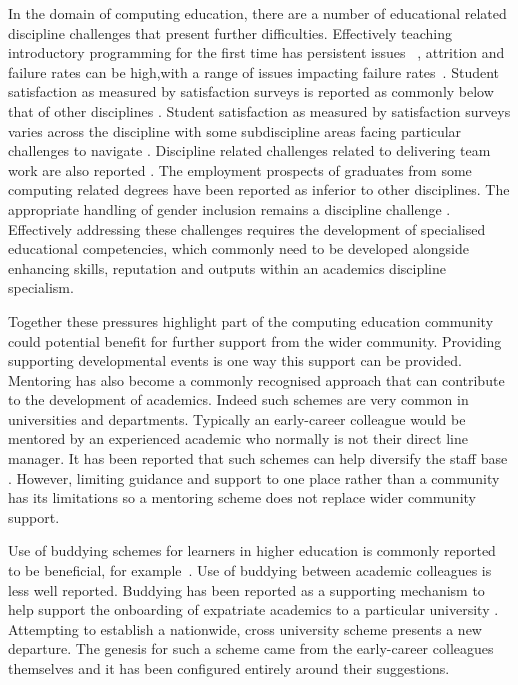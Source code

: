 \documentclass[sigconf]{acmart}
\begin{document}
In the domain of computing education, there are a number of educational related discipline challenges that present further difficulties.  Effectively teaching introductory programming for the first time has persistent issues ~\cite{davenport-et-al:latice2016,murphy-et-al:programming2017,simon-et-al:sigcse2018}, attrition and failure rates can be high,with a range of issues impacting failure rates~\cite{Watson:2014:FRI:2591708.2591749}.  Student satisfaction as measured by satisfaction surveys is reported as commonly below that of other disciplines \cite{Sinclair2015}. Student satisfaction as measured by satisfaction surveys varies across the discipline with some subdiscipline areas facing particular challenges to navigate \cite{Knutas2021}. Discipline related challenges related to delivering team work are also reported \cite{Crick2020CEP,Gordon2010}. The employment prospects of graduates from some computing related degrees have been reported as inferior to other disciplines\cite{shadbolt2016shadbolt}. The appropriate handling of gender inclusion remains a discipline challenge \cite{Winter2021}. Effectively addressing these challenges requires the development of specialised educational competencies, which commonly need to be developed alongside enhancing skills, reputation and outputs within an academics discipline specialism. 

Together these pressures highlight part of the computing education community could potential benefit for further support from the wider community. Providing supporting developmental events is one way this support can be provided. Mentoring has also become a commonly recognised approach that can contribute to the development of academics. Indeed such schemes are very common in universities and departments. Typically an early-career colleague would be mentored by an experienced academic who normally is not their direct line manager. It has been reported that such schemes can help diversify the staff base \cite{Golubchik2018}. However, limiting guidance and support to one place rather than a community has its limitations \cite{deJanasz} so a mentoring scheme does not replace wider community support.

Use of buddying schemes for learners in higher education is commonly reported to be beneficial, for example~\cite{Hayes2020,May20}. Use of buddying between academic colleagues is less well reported. Buddying has been reported as a supporting mechanism to help support the onboarding of expatriate academics to a particular university \cite{Wilkins2019}. Attempting to establish a nationwide, cross university scheme presents a new departure. The genesis for such a scheme came from the early-career colleagues themselves and it has been configured entirely around their suggestions.
	
\end{document}
